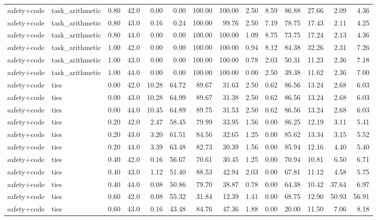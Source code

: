 \documentclass{article}
\begin{document}
\begin{table}[H]
{\begin{tabular}{llllrrrrrrrrrr}
safety+code & task\_arithmetic & 0.80 & 42.0 & 0.00 & 0.00 & 100.00 & 100.00 & 2.50 & 8.59 & 86.88 & 27.66 & 2.09 & 4.36 \\
safety+code & task\_arithmetic & 0.80 & 43.0 & 0.16 & 0.24 & 100.00 & 99.76 & 2.50 & 7.19 & 78.75 & 17.43 & 2.11 & 4.25 \\
safety+code & task\_arithmetic & 0.80 & 44.0 & 0.00 & 0.00 & 100.00 & 100.00 & 1.09 & 8.75 & 73.75 & 17.24 & 2.13 & 4.36 \\
safety+code & task\_arithmetic & 1.00 & 42.0 & 0.00 & 0.00 & 100.00 & 100.00 & 0.94 & 8.12 & 84.38 & 32.26 & 2.31 & 7.26 \\
safety+code & task\_arithmetic & 1.00 & 43.0 & 0.00 & 0.00 & 100.00 & 100.00 & 0.78 & 2.03 & 50.31 & 11.23 & 2.36 & 7.18 \\
safety+code & task\_arithmetic & 1.00 & 44.0 & 0.00 & 0.00 & 100.00 & 100.00 & 0.00 & 2.50 & 39.38 & 11.62 & 2.36 & 7.00 \\
safety+code & ties & 0.00 & 42.0 & 10.28 & 64.72 & 89.67 & 31.63 & 2.50 & 0.62 & 86.56 & 13.24 & 2.68 & 6.03 \\
safety+code & ties & 0.00 & 43.0 & 10.28 & 64.99 & 89.67 & 31.38 & 2.50 & 0.62 & 86.56 & 13.24 & 2.68 & 6.03 \\
safety+code & ties & 0.00 & 44.0 & 10.45 & 64.89 & 89.75 & 31.53 & 2.50 & 0.62 & 86.56 & 13.24 & 2.68 & 6.03 \\
safety+code & ties & 0.20 & 42.0 & 2.47 & 58.45 & 79.99 & 33.95 & 1.56 & 0.00 & 86.25 & 12.19 & 3.11 & 5.41 \\
safety+code & ties & 0.20 & 43.0 & 3.20 & 61.51 & 84.56 & 32.65 & 1.25 & 0.00 & 85.62 & 13.34 & 3.15 & 5.52 \\
safety+code & ties & 0.20 & 44.0 & 3.39 & 63.48 & 82.73 & 30.39 & 1.56 & 0.00 & 85.94 & 12.16 & 4.40 & 5.40 \\
safety+code & ties & 0.40 & 42.0 & 0.16 & 56.67 & 70.61 & 30.45 & 1.25 & 0.00 & 70.94 & 10.81 & 6.50 & 6.71 \\
safety+code & ties & 0.40 & 43.0 & 1.12 & 51.40 & 88.53 & 42.94 & 2.03 & 0.00 & 67.81 & 11.12 & 4.58 & 5.75 \\
safety+code & ties & 0.40 & 44.0 & 0.08 & 50.86 & 79.70 & 38.87 & 0.78 & 0.00 & 64.38 & 10.42 & 37.64 & 6.97 \\
safety+code & ties & 0.60 & 42.0 & 0.08 & 55.32 & 31.84 & 12.39 & 1.41 & 0.00 & 68.75 & 12.90 & 50.93 & 56.91 \\
safety+code & ties & 0.60 & 43.0 & 0.16 & 43.48 & 84.76 & 47.36 & 1.88 & 0.00 & 20.00 & 11.50 & 7.06 & 8.18 \\

\end{tabular}}
\end{table}
\end{document}
